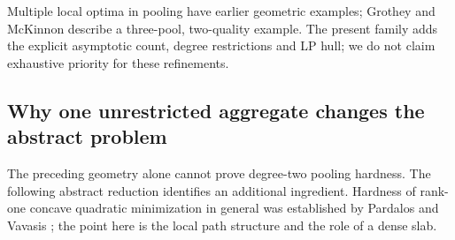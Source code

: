 Multiple local optima in pooling have earlier geometric examples;
Grothey and McKinnon \cite[Section~3]{s6:grothey2020} describe a
three-pool, two-quality example. The present family adds the explicit
asymptotic count, degree restrictions and LP hull; we do not claim
exhaustive priority for these refinements.

\subsection{Why one unrestricted aggregate changes the abstract problem}
\label{s6:slab}
The preceding geometry alone cannot prove degree-two pooling hardness.
The following abstract reduction identifies an additional ingredient.
Hardness of rank-one concave quadratic minimization in general
was established by Pardalos and Vavasis \cite{s6:pardalos1991}; the point
here is the local path structure and the role of a dense slab.

